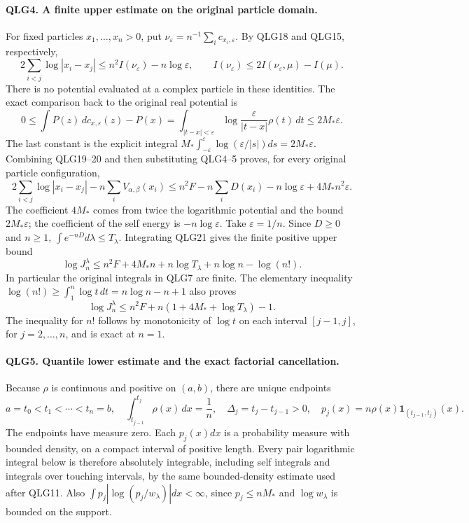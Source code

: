 \paragraph{QLG4. A finite upper estimate on the original particle domain.}
For fixed particles \(x_1,\ldots,x_n>0\), put
\(\nu_\varepsilon=n^{-1}\sum_i c_{x_i,\varepsilon}\).
By QLG18 and QLG15, respectively,
\[
 2\sum_{i<j}\log|x_i-x_j|
       \leq n^2I(\nu_\varepsilon)-n\log\varepsilon,
 \qquad
 I(\nu_\varepsilon)\leq2I(\nu_\varepsilon,\mu)-I(\mu).
 \tag{QLG19}
\]
There is no potential evaluated at a complex particle in these
identities. The exact comparison back to the original real potential is
\[
 0\leq\int P(z)\,dc_{x,\varepsilon}(z)-P(x)
 =\int_{|t-x|<\varepsilon}
               \log\frac{\varepsilon}{|t-x|}\rho(t)\,dt
 \leq2M_*\varepsilon.
 \tag{QLG20}
\]
The last constant is the explicit integral
\(M_*\int_{-\varepsilon}^{\varepsilon}
\log(\varepsilon/|s|)ds=2M_*\varepsilon\).
Combining QLG19--20 and then substituting QLG4--5 proves, for every
original particle configuration,
\[
 2\sum_{i<j}\log|x_i-x_j|-n\sum_iV_{\alpha,\beta}(x_i)
 \leq n^2F-n\sum_iD(x_i)-n\log\varepsilon
                                      +4M_*n^2\varepsilon.
 \tag{QLG21}
\]
The coefficient \(4M_*\) comes from twice the logarithmic potential
and the bound \(2M_*\varepsilon\); the coefficient of the self energy
is \(-n\log\varepsilon\).
Take \(\varepsilon=1/n\). Since \(D\geq0\) and \(n\geq1\),
\(\int e^{-nD}d\lambda\leq T_\lambda\). Integrating QLG21 gives
the finite positive upper bound
\[
 \log J_n^\lambda
 \leq n^2F+4M_*n+n\log T_\lambda+n\log n-\log(n!).
 \tag{QLG22}
\]
In particular the original integrals in QLG7 are finite. The elementary
inequality
\(\log(n!)\geq\int_1^n\log t\,dt=n\log n-n+1\)
also proves
\[
 \log J_n^\lambda
 \leq n^2F+n(1+4M_*+\log T_\lambda)-1.
 \tag{QLG23}
\]
The inequality for \(n!\) follows by monotonicity of \(\log t\)
on each interval \([j-1,j]\), for \(j=2,\ldots,n\), and is exact
at \(n=1\).

\paragraph{QLG5. Quantile lower estimate and the exact factorial cancellation.}
Because \(\rho\) is continuous and positive on \((a,b)\), there are
unique endpoints
\[
 a=t_0<t_1<\cdots<t_n=b,\quad
 \int_{t_{j-1}}^{t_j}\rho(x)\,dx=\frac1n,\quad
 \Delta_j=t_j-t_{j-1}>0,
 \quad p_j(x)=n\rho(x)\mathbf1_{(t_{j-1},t_j)}(x).
 \tag{QLG24}
\]
The endpoints have measure zero. Each \(p_j(x)dx\) is a probability
measure with bounded density, on a compact interval of positive length.
Every pair logarithmic integral below is therefore absolutely
integrable, including self integrals and integrals over touching
intervals, by the same bounded-density estimate used after QLG11.
Also \(\int p_j|\log(p_j/w_\lambda)|dx<\infty\), since
\(p_j\leq nM_*\) and \(\log w_\lambda\) is bounded on the support.

